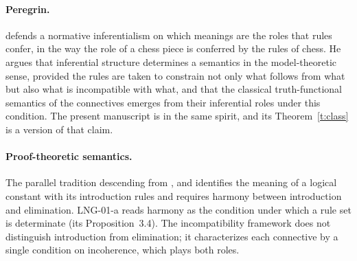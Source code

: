\documentclass{situationist-preprint}
\begin{document}
\paragraph{Peregrin.} \citet{Peregrin2014} defends a normative inferentialism on which meanings are the roles that rules confer, in the way the role of a chess piece is conferred by the rules of chess. He argues that inferential structure determines a semantics in the model-theoretic sense, provided the rules are taken to constrain not only what follows from what but also what is incompatible with what, and that the classical truth-functional semantics of the connectives emerges from their inferential roles under this condition. The present manuscript is in the same spirit, and its Theorem~\ref{t:class} is a version of that claim.

\paragraph{Proof-theoretic semantics.} The parallel tradition descending from \citet{Gentzen1935}, \citet{Prawitz1965} and \citet{Dummett1991} identifies the meaning of a logical constant with its introduction rules and requires harmony between introduction and elimination. LNG-01-a reads harmony as the condition under which a rule set is determinate (its Proposition~3.4). The incompatibility framework does not distinguish introduction from elimination; it characterizes each connective by a single condition on incoherence, which plays both roles.
\end{document}
